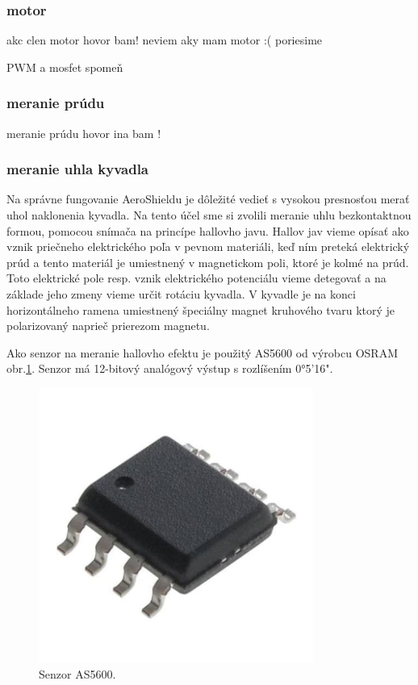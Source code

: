 \subsubsection{motor}

akc clen motor hovor bam!
neviem aky mam motor :(
poriesime

PWM a mosfet spomeň 

\subsubsection{meranie prúdu}
meranie prúdu hovor ina bam !

\subsubsection{meranie uhla kyvadla}

Na správne fungovanie AeroShieldu je dôležité vedieť s vysokou presnosťou merať uhol naklonenia kyvadla. Na tento účel sme si zvolili meranie uhlu bezkontaktnou formou, pomocou snímača na princípe hallovho javu. Hallov jav vieme opísať ako vznik priečneho elektrického poľa v pevnom materiáli, keď ním preteká elektrický prúd a tento materiál je umiestnený v magnetickom poli, ktoré je kolmé na prúd\cite{Hall}. Toto elektrické pole resp. vznik elektrického potenciálu vieme detegovať a na základe jeho zmeny vieme určit rotáciu kyvadla. V kyvadle je na konci horizontálneho ramena umiestnený špeciálny magnet kruhového tvaru ktorý je polarizovaný naprieč prierezom magnetu.

Ako senzor na meranie hallovho efektu je použitý AS5600 od výrobcu OSRAM obr.\ref{OBRAZOK 2.2}. Senzor má 12-bitový analógový výstup s rozlíšením 0°5'16".

\begin{figure}[!tbh]
\centering
\includegraphics[width=90mm]{obr/hall.jpg}
\caption{Senzor AS5600.}\label{OBRAZOK 2.2}
\end{figure}


